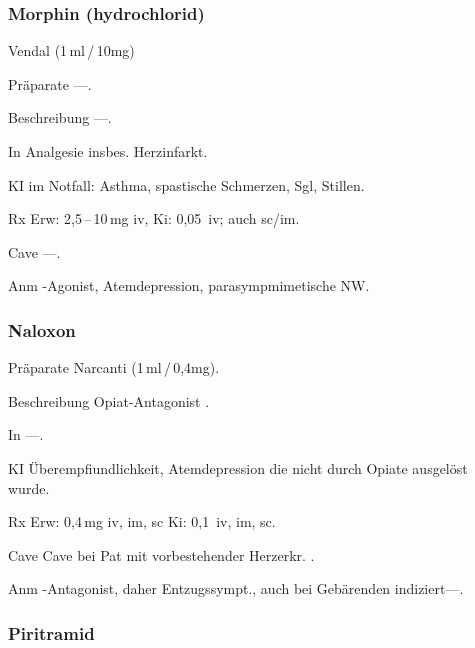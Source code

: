 \subsubsection{Morphin (hydrochlorid)}

Vendal (1\,ml\,/\,10mg)

\begin{labeling}[:]{mm}
  \item[Präparate] ---.
  \item[Beschreibung] ---.
  \item[In] Analgesie insbes. Herzinfarkt.
  \item[KI]  im Notfall: Asthma, spastische Schmerzen, Sgl, Stillen.
  \item[Rx] Erw: 2,5\,--\,10\,mg iv, Ki: 0,05\, iv; auch
  sc/im.
  \item[Cave] ---.
  \item[Anm] {\textmu}-Agonist, Atemdepression, parasympmimetische NW.
\end{labeling}







\subsubsection{Naloxon}



\begin{labeling}[:]{mm}
  \item[Präparate]  Narcanti (1\,ml\,/\,0,4mg).
  \item[Beschreibung] Opiat-Antagonist .
  \item[In] ---.
  \item[KI] Überempfiundlichkeit, Atemdepression die nicht durch Opiate
ausgelöst wurde.
  \item[Rx] Erw: 0,4\,mg iv, im, sc\newline
Ki: 0,1\, iv, im, sc.
  \item[Cave]  Cave bei Pat mit vorbestehender Herzerkr. .
  \item[Anm]  {\textmu}-Antagonist, daher Entzugssympt., auch bei Gebärenden
indiziert---.
\end{labeling}





\subsubsection{Piritramid}

